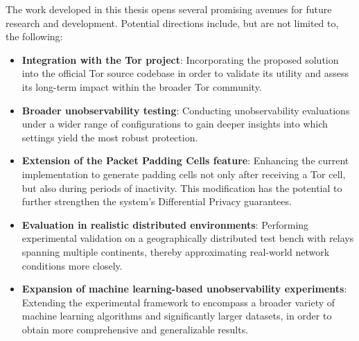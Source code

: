 The work developed in this thesis opens several promising avenues for future research and development. Potential directions include, but are not limited to, the following:
\begin{itemize}
    \item \textbf{Integration with the Tor project}: Incorporating the proposed solution into the official Tor source codebase in order to validate its utility and assess its long-term impact within the broader Tor community.
    \item \textbf{Broader unobservability testing}: Conducting unobservability evaluations under a wider range of configurations to gain deeper insights into which settings yield the most robust protection.
    \item \textbf{Extension of the Packet Padding Cells feature}: Enhancing the current implementation to generate padding cells not only after receiving a Tor cell, but also during periods of inactivity. This modification has the potential to further strengthen the system's Differential Privacy guarantees.
    \item \textbf{Evaluation in realistic distributed environments}: Performing experimental validation on a geographically distributed test bench with relays spanning multiple continents, thereby approximating real-world network conditions more closely.
    \item \textbf{Expansion of machine learning-based unobservability experiments}: Extending the experimental framework to encompass a broader variety of machine learning algorithms and significantly larger datasets, in order to obtain more comprehensive and generalizable results.
\end{itemize}
